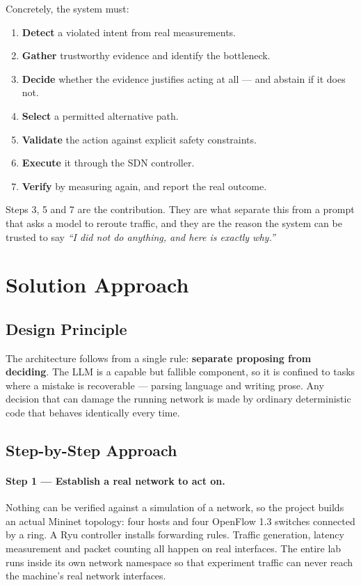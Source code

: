 \documentclass[12pt,a4paper]{report}
\begin{document}
Concretely, the system must:

\begin{enumerate}
    \item \textbf{Detect} a violated intent from real measurements.
    \item \textbf{Gather} trustworthy evidence and identify the bottleneck.
    \item \textbf{Decide} whether the evidence justifies acting at all --- and
          abstain if it does not.
    \item \textbf{Select} a permitted alternative path.
    \item \textbf{Validate} the action against explicit safety constraints.
    \item \textbf{Execute} it through the SDN controller.
    \item \textbf{Verify} by measuring again, and report the real outcome.
\end{enumerate}

Steps 3, 5 and 7 are the contribution. They are what separate this from a
prompt that asks a model to reroute traffic, and they are the reason the system
can be trusted to say \emph{``I did not do anything, and here is exactly why.''}

\section{Solution Approach}

\subsection{Design Principle}

The architecture follows from a single rule: \textbf{separate proposing from
deciding}. The LLM is a capable but fallible component, so it is confined to
tasks where a mistake is recoverable --- parsing language and writing prose. Any
decision that can damage the running network is made by ordinary deterministic
code that behaves identically every time.

\subsection{Step-by-Step Approach}

\paragraph{Step 1 --- Establish a real network to act on.}
Nothing can be verified against a simulation of a network, so the project builds
an actual Mininet topology: four hosts and four OpenFlow 1.3 switches connected
by a ring. A Ryu controller installs forwarding rules. Traffic generation,
latency measurement and packet counting all happen on real interfaces. The
entire lab runs inside its own network namespace so that experiment traffic can
never reach the machine's real network interfaces.
\end{document}

